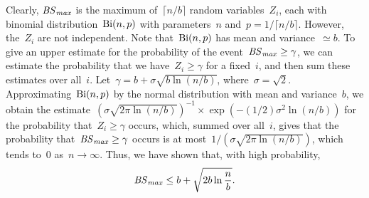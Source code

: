 Clearly, $\mathit{BS}_{\mathit{max}}$ is the maximum
of~$\lceil n/b\rceil$ random variables~$Z_i$, each with binomial
distribution~$\mathop{\rm Bi}\nolimits(n,p)$ with parameters~$n$ and~$p=1/\lceil n/b\rceil$.
However, the~$Z_i$ are not independent.  Note that~$\mathop{\rm Bi}\nolimits(n,p)$ has mean and
variance~$\simeq b$.  To give an upper estimate for the probability of the
event~$\mathit{BS}_{\mathit{max}}\geq \gamma$, we can estimate the probability that we have~$Z_i\geq \gamma$
for a fixed~$i$, and then sum these estimates over all~$i$.
Let~$\gamma=b+\sigma\sqrt{b\ln(n/b)}$, where~$\sigma=\sqrt2$.
Approximating~$\mathop{\rm Bi}\nolimits(n,p)$ by the normal distribution with mean and
variance~$b$, we obtain the
estimate~$(\sigma\sqrt{2\pi\ln(n/b)})^{-1}\times\exp(-(1/2)\sigma^2\ln(n/b))$ for
the probability that~$Z_i\geq \gamma$ occurs, which, summed over all~$i$, gives
that the probability that~$\mathit{BS}_{\mathit{max}}\geq \gamma$ occurs is at
most~$1/(\sigma\sqrt{2\pi\ln(n/b)})$, which tends to~$0$ as~$n\to\infty$.
Thus, we have shown that, with high probability, 
\begin{equation}
  \label{eq:maxbs}
  \mathit{BS}_{\mathit{max}}\leq b+\sqrt{2b\ln{n\over b}}.
\end{equation}



